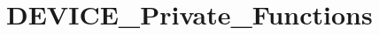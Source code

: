 \hypertarget{group___d_e_v_i_c_e___private___functions}{}\section{D\+E\+V\+I\+C\+E\+\_\+\+Private\+\_\+\+Functions}
\label{group___d_e_v_i_c_e___private___functions}
